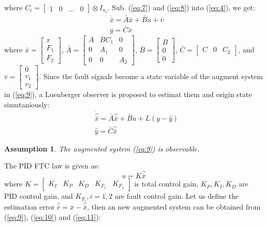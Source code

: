 \documentclass{ieeeaccess}
\newtheorem{assumption}{Assumption}[section]
\begin{document}
where $C_i=\begin{bmatrix}
    1 & 0 & \dots & 0
\end{bmatrix}\otimes I_{n_i}$. Sub. (\ref{eq:7}) and (\ref{eq:8}) into (\ref{eq:4}), we get:
\begin{equation} \label{eq:9}
    \begin{split}
        & \dot{\bar{x}} = \bar{A}\bar{x}+\bar{B}u+\bar{v} \\
        & y=\bar{C}\bar{x}
    \end{split}
\end{equation}
where $\bar{x} = \begin{bmatrix}
    x \\ F_1 \\ F_2
\end{bmatrix}$, $\bar{A}=\begin{bmatrix}
    A & BC_1 & 0 \\
    0 & A_1 & 0 \\
    0 & 0 & A_2
\end{bmatrix}$, $\bar{B}=\begin{bmatrix}
    B \\ 0 \\ 0
\end{bmatrix}$, $\bar{C}=\begin{bmatrix}
    C & 0 & C_2
\end{bmatrix}$, and $\bar{v}=\begin{bmatrix}
    0 \\ v_1 \\ v_2
\end{bmatrix}$. Since the fault signals become a state variable of the augment system in (\ref{eq:9}), a Luenberger observer is proposed to estimat them and origin state simutaniously:
\begin{equation} \label{eq:10}
    \begin{split}
        & \dot{\hat{\bar{x}}}=\bar{A}\hat{\bar{x}}+\bar{B}u+{L}(y-\hat{y}) \\
        & \hat{y}=\bar{C}\hat{\bar{x}}  
    \end{split}
\end{equation}
\begin{assumption}
    The augmented system (\ref{eq:9}) is observable.
\end{assumption}
The PID FTC law is given as:
\begin{equation} \label{eq:11}
    u=K\hat{\bar{x}}
\end{equation}
where $K = \begin{bmatrix}
    K_I & K_P & K_D & K_{F_1} & K_{F_2}
\end{bmatrix}$ is total control gain, $K_P,K_I,K_D$ are PID control gain, and $K_{F_i}, i=1,2$ are fault control gain. Let us define the estimation error $\hat{\bar{e}}=\bar{x}-\hat{\bar{x}}$, then an new augmented system can be obtained from (\ref{eq:9}), (\ref{eq:10}) and (\ref{eq:11}):
\end{document}
